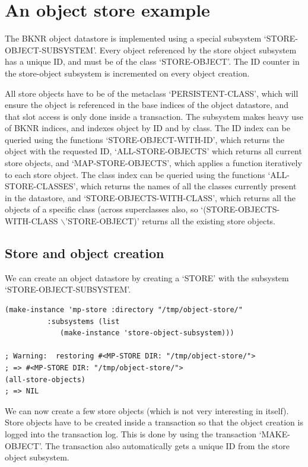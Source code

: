 \section{ An object store example}
The BKNR object datastore is implemented using a special subsystem
`STORE-OBJECT-SUBSYSTEM'. Every object referenced by the store
object subsystem has a unique ID, and must be of the class
`STORE-OBJECT'. The ID counter in the store-object subsystem is
incremented on every object creation.

All store objects have to be of the metaclass `PERSISTENT-CLASS',
which will ensure the object is referenced in the base indices of
the object datastore, and that slot access is only done inside a
transaction. The subsystem makes heavy use of BKNR indices, and
indexes object by ID and by class.
The ID index can be queried using the functions
`STORE-OBJECT-WITH-ID', which returns the object with the
requested ID, `ALL-STORE-OBJECTS' which returns all current store
objects, and `MAP-STORE-OBJECTS', which applies a function
iteratively to each store object. The class index can be queried
using the functions `ALL-STORE-CLASSES', which returns the names
of all the classes currently present in the datastore, and
`STORE-OBJECTS-WITH-CLASS', which returns all the objects of a
specific class (across superclasses also, so
`(STORE-OBJECTS-WITH-CLASS $\backslash$'STORE-OBJECT)' returns all the
existing store objects.


\subsection{ Store and object creation}
We can create an object datastore by creating a `STORE' with the
subsystem `STORE-OBJECT-SUBSYSTEM'.

\begin{Verbatim}[fontsize=\small,frame=leftline,framerule=0.9mm,rulecolor=\color{gray},framesep=5.1mm,xleftmargin=5mm,fontfamily=cmtt]
(make-instance 'mp-store :directory "/tmp/object-store/"
          :subsystems (list
             (make-instance 'store-object-subsystem)))

; Warning:  restoring #<MP-STORE DIR: "/tmp/object-store/">
; => #<MP-STORE DIR: "/tmp/object-store/">
(all-store-objects)
; => NIL
\end{Verbatim}
We can now create a few store objects (which is not very
interesting in itself). Store objects have to be created inside a
transaction so that the object creation is logged into the
transaction log. This is done by using the transaction
`MAKE-OBJECT'. The transaction also automatically gets a unique ID
from the store object subsystem.

